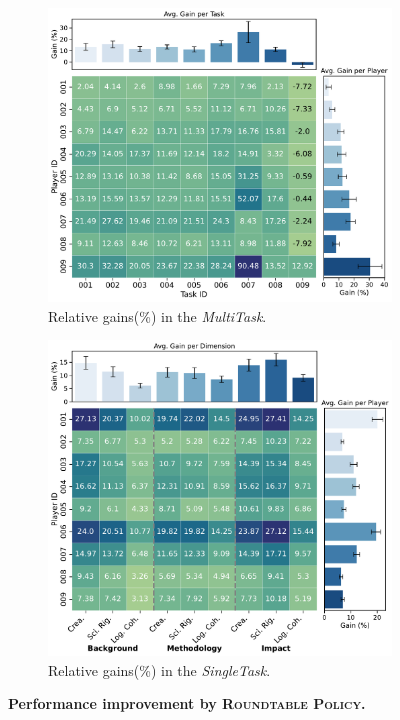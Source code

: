 \begin{figure}[h]
  \centering
  \begin{subfigure}[c]{0.49\textwidth}
    \includegraphics[width=\linewidth]{figures/gain_validity/multitask/multitask_2d_gain.pdf}
    \caption{\footnotesize Relative gains(\%) in the \emph{MultiTask}.}
    \label{fig:improvement_multitask}
  \end{subfigure}
  \hfill
  \begin{subfigure}[c]{0.49\textwidth}
    \includegraphics[width=\linewidth]{figures/gain_validity/singletask/singletask_2d_gain.pdf}
    \caption{\footnotesize Relative gains(\%) in the \emph{SingleTask}.}
    \label{fig:improvement_singletask}
  \end{subfigure}

  \caption{\textbf{Performance improvement by \textsc{Roundtable Policy}.}}
  \label{fig:improvement_validity}
\end{figure}
